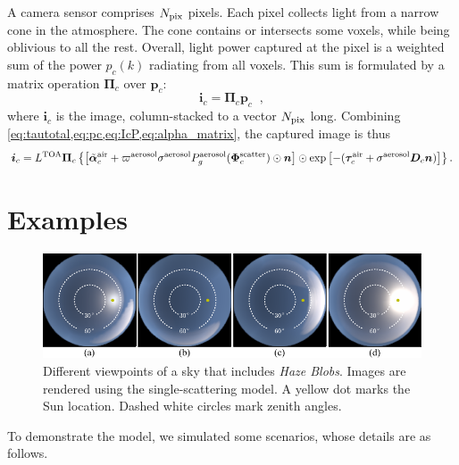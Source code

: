 \documentclass[10pt,letterpaper]{article}
\newcommand{\vect}[1]{\bm{#1}}
\newcommand{\yoavcomment}[1]{}
\renewcommand{\yoavcomment}[1]{#1} %
\begin{document}
A camera sensor comprises $N_{\rm pix}$ pixels. Each pixel collects light from a narrow cone in the
atmosphere. The cone contains or intersects some voxels, while being
oblivious to all the rest.  Overall, light power captured at the pixel
is a weighted sum of the power $p_c(k)$ radiating from all voxels.  This sum is
formulated by a matrix operation ${\vect{\Pi}}_c$ over ${\bm p}_c$:
\begin{equation}
  {\bm i}_c= {\vect{\Pi}}_c{\bm p}_c
  \;\;,
  \label{eq:IcP}
\end{equation}
where ${\bm i}_c$ is the image, column-stacked to a vector $N_{\rm
  pix}$ long.  Combining
\cref{eq:tautotal,eq:pc,eq:IcP,eq:alpha_matrix}, the captured image is thus
\begin{align}
  {\bm i}_c= L^{\rm TOA} {\vect{\Pi}}_c \left\{
  \left[\tilde{\vect{\alpha}}^{\rm air}_c + \varpi^{\rm aerosol}\sigma^{\rm
    aerosol} P^{\rm aerosol}_g(\vect{\Phi}^{\rm scatter}_c) \odot{\bm
    n} \right] \odot \exp\left[-(\vect{\tau}_c^{\rm air} + {\sigma}^{\rm aerosol}
  {\bm D}_c{\bm n})\right] \right\} .
  \label{eq:bigIA}
\end{align}


\section{Examples}
\label{sec:simul}

\begin{figure}
  \centering
  \yoavcomment{\includegraphics[width=\linewidth]{images/single_images.pdf}}
  \caption{\small Different viewpoints of a sky that includes {\em
      Haze Blobs}. Images are rendered using the single-scattering model.
    A yellow dot marks the Sun location. Dashed white circles mark
    zenith angles.}
  \label{fig:simulation-results1}
\end{figure}
To demonstrate the model, we simulated some scenarios, whose details are as follows.
\\
\end{document}
